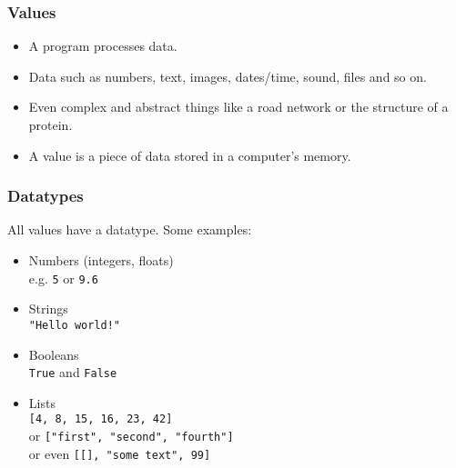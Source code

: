 \documentclass[notes]{beamer}
\begin{document}
	\begin{frame}[fragile]
		\frametitle{Values}
		
		\begin{itemize}
			\item A program processes data.
			\item Data such as numbers, text, images, dates/time, sound, files and so on.
			\item Even complex and abstract things like a road network or the structure of a protein.
			\item A value is a piece of data stored in a computer's memory.
		\end{itemize}
	\end{frame}
	
	\begin{frame}[fragile]
		\frametitle{Datatypes}
		
		All values have a datatype. Some examples:
		
		\begin{itemize}
			\item Numbers (integers, floats) \\
			e.g. \colorbox{codebg}{\lstinline|5|} or \colorbox{codebg}{\lstinline|9.6|}
			
			\pause
			
			\item Strings \\
			\colorbox{codebg}{\lstinline|"Hello world!"|}
			
			\pause
			
			\item Booleans \\
			\colorbox{codebg}{\lstinline|True|} and \colorbox{codebg}{\lstinline|False|}
			
			\pause
			
			\item Lists \\
			\colorbox{codebg}{\lstinline|[4, 8, 15, 16, 23, 42]|} \\
			or \colorbox{codebg}{\lstinline|["first", "second", "fourth"]|} \\
			or even \colorbox{codebg}{\lstinline|[[], "some text", 99]|}
			

\end{itemize}
\end{frame}
\end{document}
